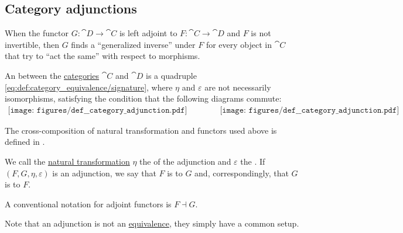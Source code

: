 \subsection{Category adjunctions}\label{subsec:category_adjunctions}

\begin{remark}\label{rem:adjoint_functors}\cite{StanfordPlato:category_theory}
  When the functor \( G: \cat{D} \to \cat{C} \) is left adjoint to \( F: \cat{C} \to \cat{D} \) and \( F \) is not invertible, then \( G \) finds a \enquote{generalized inverse} under \( F \) for every object in \( \cat{C} \) that try to \enquote{act the same} with respect to morphisms.
\end{remark}

\begin{definition}\label{def:category_adjunction}
  An  between the \hyperref[def:category]{categories} \( \cat{C} \) and \( \cat{D} \) is a quadruple \eqref{eq:def:category_equivalence/signature}, where \( \eta \) and \( \varepsilon \) are not necessarily isomorphisms, satisfying the condition that the following diagrams commute:
  \begin{equation}\label{eq:def:category_adjunction/diagrams}
    \begin{aligned}
      \texttt{[image: figures/def\_\_category\_adjunction.pdf]}
      \quad\quad\quad\quad
      \texttt{[image: figures/def\_\_category\_adjunction.pdf]}
    \end{aligned}
  \end{equation}

  The cross-composition of natural transformation and functors used above is defined in .

  We call the \hyperref[def:natural_transformation]{natural transformation} \( \eta \) the  of the adjunction and \( \varepsilon \) the . If \( (F, G, \eta, \varepsilon) \) is an adjunction, we say that \( F \) is  to \( G \) and, correspondingly, that \( G \) is  to \( F \).

  A conventional notation for adjoint functors is \( F \dashv G \).

  Note that an adjunction is not an \hyperref[def:category_equivalence]{equivalence}, they simply have a common setup.
\end{definition}
